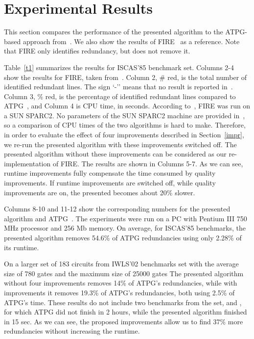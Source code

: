 \documentclass[conference]{IEEEtran} \usepackage{times}
\begin{document}
\section{Experimental Results}
\label{exp}


This section compares the performance of the presented algorithm to
the ATPG-based approach from~\cite{BrD94}.  We also show the results
of FIRE~\cite{IyA96} as a reference. Note that FIRE only identifies
redundancy, but does not remove it.

Table~\ref{t1} summarizes the results for ISCAS'85 benchmark set.
Columns 2-4 show the results for FIRE, taken from~\cite{IyA96}. Column
2, \# red, is the total number of identified redundant lines. The sign
`-'' means that no result is reported in~\cite{IyA96}.  Column 3, \%
red, is the percentage of identified redundant lines compared to
ATPG~\cite{BrD94}, and Column 4 is CPU time, in seconds. According
to~\cite{IyA96}, FIRE was run on a SUN SPARC2. No parameters of the
SUN SPARC2 machine are provided in~\cite{IyA96}, so a comparison of
CPU times of the two algorithms is hard to make.  Therefore, in order
to evaluate the effect of four improvements described in
Section~\ref{impr}, we re-run the presented algorithm with these improvements
switched off.  The presented algorithm without these improvements can be considered
as our re-implementation of FIRE.  The results are shown in Columns
5-7. As we can see, runtime improvements fully compensate the time
consumed by quality improvements. If runtime improvements are switched
off, while quality improvements are on, the presented becomes about 20\%
slower.

Columns 8-10 and 11-12 show the corresponding numbers for the presented algorithm and
ATPG~\cite{BrD94}. The experiments were run on a PC with Pentium III
750 MHz processor and 256 Mb memory.  On average, for ISCAS'85
benchmarks, the presented algorithm removes 54.6\% of ATPG redundancies using only
2.28\% of its runtime.

On a larger set of 183 circuits from IWLS'02 benchmarks set with the
average size of 780 gates and the maximum size of 25000 gates
The presented algorithm without four improvements removes 14\% of ATPG's
redundancies, while with improvements it removes 19.3\% of ATPG's redundancies,
both using 2.5\% of ATPG's time. These results do not include two
benchmarks from the set,  and , for which ATPG did not
finish in 2 hours, while the presented algorithm finished in 15 sec. As we can see,
the proposed improvements allow us to find 37\% more redundancies
without increasing the runtime.
\end{document}
